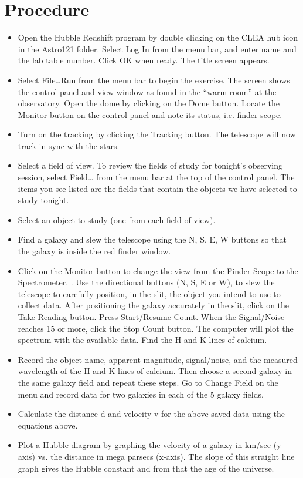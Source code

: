 \documentclass[letterpaper,11pt]{report}
\begin{document}
\section{Procedure}
\begin{itemize}
    \item  Open the Hubble Redshift program by double clicking on the CLEA hub icon in the Astro121 folder. Select Log In from the menu bar, and enter name and the lab table number. Click OK when ready. The title screen appears.
    \item Select File…Run from the menu bar to begin the exercise. The screen shows the control panel and view
    window as found in the “warm room” at the observatory. Open the dome by clicking on the Dome button. Locate the Monitor button on the control panel and note its status, i.e. finder scope.
    \item Turn on the tracking by clicking the Tracking button. The telescope will now track in sync with the stars.
    \item Select a field of view. To review the fields of study for tonight’s observing session, select Field… from the menu bar at the top of the control panel. The items you see listed are the fields that contain the objects we have selected to study tonight.
    \item Select an object to study (one from each field of view).
    \item Find a galaxy and slew the telescope using the N, S, E, W buttons so that the galaxy is inside the red finder window.
    \item Click on the Monitor button to change the view from the Finder Scope to the Spectrometer. . Use the directional buttons (N, S, E or W), to slew the telescope to carefully
    position, in the slit, the object you intend to use to collect data. After positioning the galaxy accurately in the slit, click on the Take Reading button. Press Start/Resume Count. When the Signal/Noise reaches 15 or more, click the Stop Count button. The computer will plot the spectrum with the available data. Find the H and K lines of calcium.
    \item Record the object name, apparent magnitude, signal/noise, and the measured wavelength of the H and K lines of calcium. Then choose a second galaxy in the same galaxy field and repeat these steps. Go to Change Field on the menu and record data for two galaxies in each of the 5 galaxy fields.
    \item Calculate the distance d and velocity v for the above saved data using the equations above.
    \item Plot a Hubble diagram by graphing the velocity of a galaxy in km/sec (y-axis) vs. the distance in mega parsecs (x-axis). The slope of this straight line graph gives the Hubble constant and from that the age of the universe.
\end{itemize}
\end{document}
